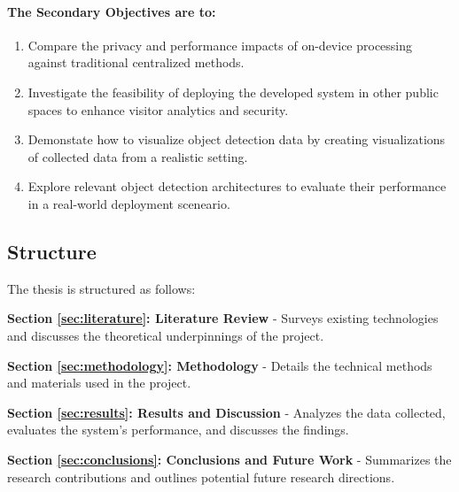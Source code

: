 \paragraph{The Secondary Objectives are to:}
\begin{enumerate}
	\item Compare the privacy and performance impacts of on-device processing against traditional centralized methods.
	\item Investigate the feasibility of deploying the developed system in other public spaces to enhance visitor analytics and security.
	\item Demonstate how to visualize object detection data by creating visualizations of collected data from a realistic setting.
	\item Explore relevant object detection architectures to evaluate their performance in a real-world deployment sceneario.
\end{enumerate}


\subsection{Structure}
\label{sec:structure}
The thesis is structured as follows:

\textbf{Section \ref{sec:literature}: Literature Review} - Surveys existing technologies and discusses the theoretical underpinnings of the project.

\textbf{Section \ref{sec:methodology}: Methodology} - Details the technical methods and materials used in the project.

\textbf{Section \ref{sec:results}: Results and Discussion} - Analyzes the data collected, evaluates the system's performance, and discusses the findings.

\textbf{Section \ref{sec:conclusions}: Conclusions and Future Work} - Summarizes the research contributions and outlines potential future research directions.
